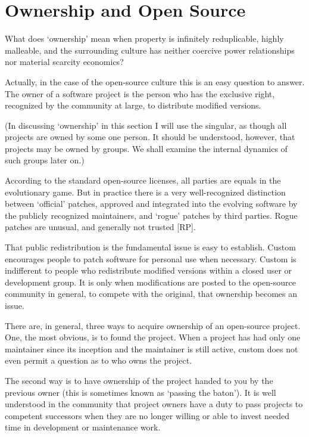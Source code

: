 \section{Ownership and Open Source}

What does `ownership' mean when property is infinitely reduplicable, highly
malleable, and the surrounding culture has neither coercive power relationships
nor material scarcity economics?

Actually, in the case of the open-source culture this is an easy question to
answer.  The owner of a software project is the person who has the exclusive
right, recognized by the community at large, to distribute modified versions.

(In discussing `ownership' in this section I will use the singular, as though
all projects are owned by some one person.  It should be understood, however,
that projects may be owned by groups.  We shall examine the internal dynamics of
such groups later on.)

According to the standard open-source licenses, all parties are equals in the
evolutionary game.  But in practice there is a very well-recognized distinction
between `official' patches, approved and integrated into the evolving software
by the publicly recognized maintainers, and `rogue' patches by third parties.
Rogue patches are unusual, and generally not trusted [RP].

That public redistribution is the fundamental issue is easy to establish.
Custom encourages people to patch software for personal use when necessary.
Custom is indifferent to people who redistribute modified versions within a
closed user or development group.  It is only when modifications are posted to
the open-source community in general, to compete with the original, that
ownership becomes an issue.

There are, in general, three ways to acquire ownership of an open-source
project.  One, the most obvious, is to found the project.  When a project has
had only one maintainer since its inception and the maintainer is still active,
custom does not even permit a question as to who owns the project.

The second way is to have ownership of the project handed to you by the previous
owner (this is sometimes known as `passing the baton').  It is well understood
in the community that project owners have a duty to pass projects to competent
successors when they are no longer willing or able to invest needed time in
development or maintenance work.

